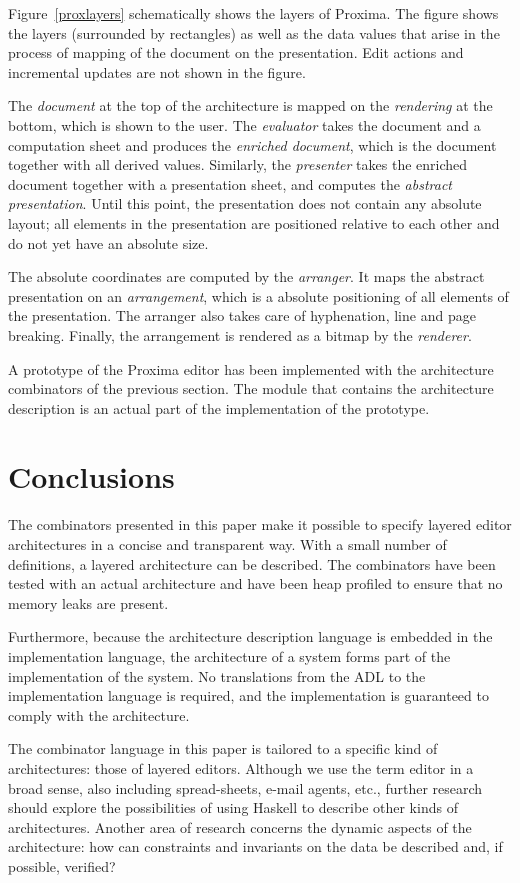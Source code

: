 Figure~\ref{proxlayers} schematically shows the layers of Proxima. The figure shows the layers (surrounded by rectangles) as well as the data values that arise in the process of mapping of the document on the presentation. Edit actions and incremental updates are not shown in the figure.

The {\em document} at the top of the architecture is mapped on the {\em rendering} at the bottom, which is shown to the user. The {\em evaluator} takes the document and a computation sheet and produces the {\em enriched document}, which is the document together with all derived values. Similarly, the {\em presenter} takes the enriched document together with a presentation sheet, and computes the {\em abstract presentation}. Until this point, the presentation does not contain any absolute layout; all elements in the presentation are positioned relative to each other and do not yet have an absolute size.

The absolute coordinates are computed by the {\em arranger}. It maps the abstract presentation on an {\em arrangement}, which is a absolute positioning of all elements of the presentation. The arranger also takes care of hyphenation, line and page breaking. Finally, the arrangement is rendered as a bitmap by the {\em renderer}.

A prototype of the Proxima editor has been implemented with the architecture combinators of the previous section. The module that contains the architecture description is an actual part of the implementation of the prototype.

%									
%									
%									
\section{Conclusions} \label{secthaskellconclusions}

The combinators presented in this paper make it possible to specify layered editor architectures in a concise and transparent way. With a small number of definitions, a layered architecture can be described. The combinators have been tested with an actual architecture and have been heap profiled to ensure that no memory leaks are present.

Furthermore, because the architecture description language is embedded in the implementation language, the architecture of a system forms part of the implementation of the system. No translations from the ADL to the implementation language is required, and the implementation is guaranteed to comply with the architecture.

The combinator language in this paper is tailored to a specific kind of architectures: those of layered editors. Although we use the term editor in a broad sense, also including spread-sheets, e-mail agents, etc., further research should explore the possibilities of using Haskell to describe other kinds of architectures. Another area of research concerns the dynamic aspects of the architecture: how can constraints and invariants on the data be described and, if possible, verified?
